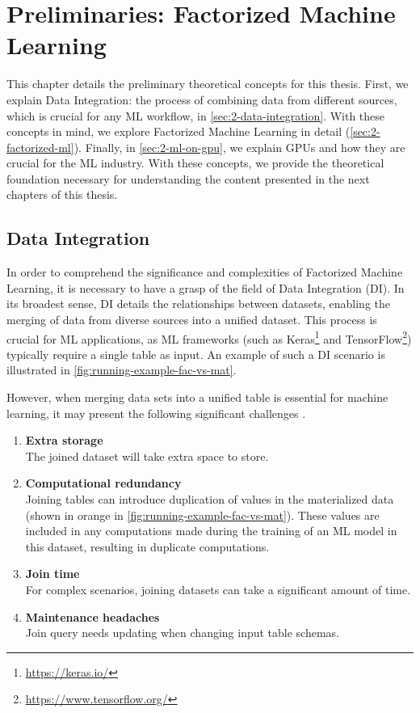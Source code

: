 
\chapter{Preliminaries: Factorized Machine Learning}
\label{chapter:preliminary}

This chapter details the preliminary theoretical concepts for this thesis. First, we explain Data Integration: the process of combining data from different sources, which is crucial for any ML workflow, in \autoref{sec:2-data-integration}. With these concepts in mind, we explore Factorized Machine Learning in detail (\autoref{sec:2-factorized-ml}). Finally, in \autoref{sec:2-ml-on-gpu}, we explain GPUs and how they are crucial for the ML industry. With these concepts, we provide the theoretical foundation necessary for understanding the content presented in the next chapters of this thesis.


\section{Data Integration}
\label{sec:2-data-integration}
In order to comprehend the significance and complexities of Factorized Machine Learning, it is necessary to have a grasp of the field of Data Integration (DI). In its broadest sense, DI details the relationships between datasets, enabling the merging of data from diverse sources into a unified dataset. This process is crucial for ML applications, as ML frameworks (such as Keras\footnote{\url{https://keras.io/}} and TensorFlow\footnote{\url{https://www.tensorflow.org/}}) typically require a single table as input. An example of such a DI scenario is illustrated in \autoref{fig:running-example-fac-vs-mat}.

However, when merging data sets into a unified table is essential for machine learning, it may present the following significant challenges \cite{data-management-in-ML-kumar-2017}.

\begin{enumerate}
  \item \textbf{Extra storage}\\ The joined dataset will take extra space to store.
  \item \textbf{Computational redundancy} \\ Joining tables can introduce duplication of values in the materialized data (shown in orange in \autoref{fig:running-example-fac-vs-mat}). These values are included in any computations made during the training of an ML model in this dataset, resulting in duplicate computations.
  \item \textbf{Join time} \\For complex scenarios, joining datasets can take a significant amount of time.
  \item \textbf{Maintenance headaches} \\Join query needs updating when changing input table schemas.
\end{enumerate}


